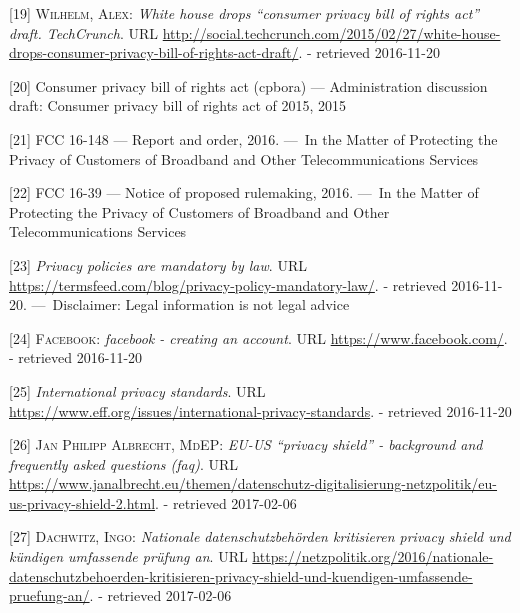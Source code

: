 \documentclass[12pt,english,a4paper,titlepage,cleardoublepage=empty,dottedtoc]{report}
\begin{document}
\hypertarget{ref-web_2015_white-house-releases-consumer-privacy-bill-draft}{}
{[}19{]} \textsc{Wilhelm, Alex}: \emph{White house drops ``consumer
privacy bill of rights act'' draft. TechCrunch}. URL
\url{http://social.techcrunch.com/2015/02/27/white-house-drops-consumer-privacy-bill-of-rights-act-draft/}.
- retrieved 2016-11-20

\hypertarget{ref-bill-draft_2015_us_consumer-privacy-bill-of-rights-act_definition}{}
{[}20{]} Consumer privacy bill of rights act (cpbora) --- Administration
discussion draft: Consumer privacy bill of rights act of 2015, 2015

\hypertarget{ref-rules_2016_fcc_to-protect-broadband-consumer-privacy_sensitive-types-of-data}{}
{[}21{]} FCC 16-148 --- Report and order, 2016. ---~In the Matter of
Protecting the Privacy of Customers of Broadband and Other
Telecommunications Services

\hypertarget{ref-rules_2016_fcc_to-protect-broadband-consumer-privacy_personally-identifiable-information}{}
{[}22{]} FCC 16-39 --- Notice of proposed rulemaking, 2016. ---~In the
Matter of Protecting the Privacy of Customers of Broadband and Other
Telecommunications Services

\hypertarget{ref-web_2016_privacy-policies-are-mandatory-by-law}{}
{[}23{]} \emph{Privacy policies are mandatory by law}. URL
\url{https://termsfeed.com/blog/privacy-policy-mandatory-law/}. -
retrieved 2016-11-20. ---~Disclaimer: Legal information is not legal
advice

\hypertarget{ref-web_2016_facebooks-landing-page_policy-acknowledgement}{}
{[}24{]} \textsc{Facebook}: \emph{facebook - creating an account}. URL
\url{https://www.facebook.com/}. - retrieved 2016-11-20

\hypertarget{ref-web_2016_international-privacy-standards}{}
{[}25{]} \emph{International privacy standards}. URL
\url{https://www.eff.org/issues/international-privacy-standards}. -
retrieved 2016-11-20

\hypertarget{ref-web_2017_privacy-shield_faq}{}
{[}26{]} \textsc{Jan Philipp Albrecht, MdEP}: \emph{EU-US ``privacy
shield'' - background and frequently asked questions (faq)}. URL
\url{https://www.janalbrecht.eu/themen/datenschutz-digitalisierung-netzpolitik/eu-us-privacy-shield-2.html}.
- retrieved 2017-02-06

\hypertarget{ref-web_2017_privacy-shield_kritik}{}
{[}27{]} \textsc{Dachwitz, Ingo}: \emph{Nationale datenschutzbehörden
kritisieren privacy shield und kündigen umfassende prüfung an}. URL
\url{https://netzpolitik.org/2016/nationale-datenschutzbehoerden-kritisieren-privacy-shield-und-kuendigen-umfassende-pruefung-an/}.
- retrieved 2017-02-06
\end{document}
